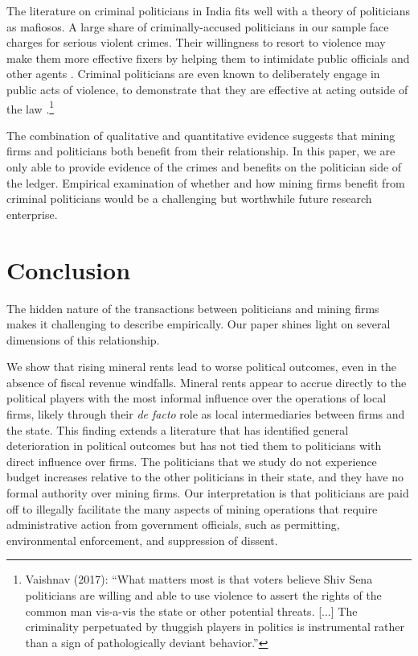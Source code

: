 \documentclass[12pt,letterpaper]{article}
\begin{document}
The literature on criminal politicians in India fits well with a
theory of politicians as mafiosos. A large share of criminally-accused
politicians in our sample face charges for serious violent
crimes. Their willingness to resort to violence may make them more
effective fixers by helping them to intimidate public officials and
other agents \cite{Vaishnav2017}. Criminal politicians are even known
to deliberately engage in public acts of violence, to demonstrate that
they are effective at acting outside of the law
\cite{Witsoe2009a,Berenschot2011a,Vaishnav2017}.\footnote{Vaishnav (2017): ``What matters most is that voters believe Shiv Sena politicians are willing and able to use violence to assert the rights of the common man vis-a-vis the state or other potential threats. [...] The criminality perpetuated by thuggish players in politics is instrumental rather than a sign of pathologically deviant behavior.''}

The combination of qualitative and quantitative evidence suggests that
mining firms and politicians both benefit from their relationship. In
this paper, we are only able to provide evidence of the crimes
and benefits on the politician side of the ledger. Empirical
examination of whether and how mining firms benefit from criminal
politicians would be a challenging but worthwhile future research
enterprise.


\section{Conclusion}
\label{sec:conc}

The hidden nature of the transactions between politicians and mining
firms makes it challenging to describe empirically. Our paper shines
light on several dimensions of this relationship.

We show that rising mineral rents lead to worse political outcomes,
even in the absence of fiscal revenue windfalls.  Mineral rents appear
to accrue directly to the political players with the most informal
influence over the operations of local firms, likely through their
\textit{de facto} role as local intermediaries between firms and the
state. This finding extends a literature that has identified general
deterioration in political outcomes but has not tied them to
politicians with direct influence over firms. The politicians that we
study do not experience budget increases relative to the other
politicians in their state, and they have no formal authority over
mining firms. Our interpretation is that politicians are paid off to
illegally facilitate the many aspects of mining operations that
require administrative action from government officials, such as
permitting, environmental enforcement, and suppression of dissent.
\end{document}
